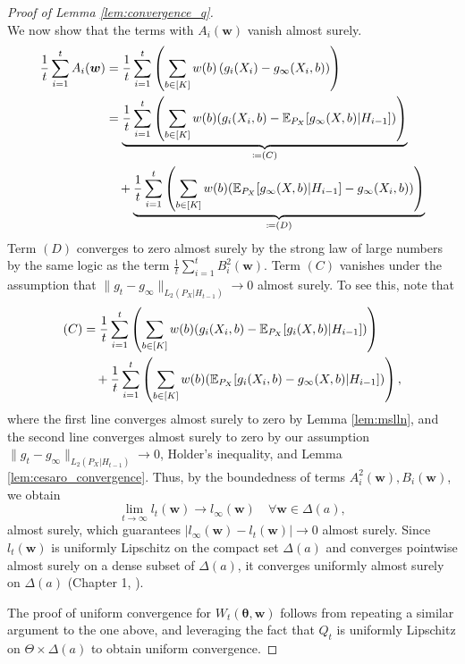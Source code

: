 \documentclass{article}
\begin{document}
\begin{appendices}
\begin{proof}[Proof of Lemma \ref{lem:convergence_q}]
\begin{equation}
\end{equation}
We now show that the terms with $A_i(\bm{w})$ vanish almost surely. 
\begin{align}
    \frac{1}{t}\sum_{i=1}^t A_i(\boldsymbol{w}) &= \frac{1}{t}\sum_{i=1}^t \left(\sum_{b \in [K]} w(b) \left( g_i(X_i) - g_\infty(X_i, b) \right) \right) \\
    &= \underbrace{\frac{1}{t}\sum_{i=1}^t \left(\sum_{b \in [K]} w(b)(g_i(X_i,b) - \mathbb{E}_{P_X}[g_\infty(X,b)|H_{i-1}]) \right)}_{\coloneqq(C)}\\
    &\quad + \underbrace{\frac{1}{t}\sum_{i=1}^t \left(\sum_{b \in [K]} w(b) (\mathbb{E}_{P_X}[g_\infty(X, b)|H_{i-1}] - g_\infty(X_i,b)) \right)}_{\coloneqq(D)}
\end{align}
Term $(D)$ converges to zero almost surely by the strong law of large numbers by the same logic as the term $\frac{1}{t}\sum_{i=1}^t B_i^2(\bm{w})$. Term $(C)$ vanishes under the assumption that $\|g_t -g_\infty\|_{L_2(P_X|H_{t-1})} \rightarrow 0$ almost surely. To see this, note that 
\begin{align}
    (C) &= \frac{1}{t}\sum_{i=1}^t \left(\sum_{b \in [K]} w(b)(g_i(X_i,b) - \mathbb{E}_{P_X}[g_i(X,b)|H_{i-1}]) \right) \\
    &\quad + \frac{1}{t}\sum_{i=1}^t \left(\sum_{b \in [K]} w(b)(\mathbb{E}_{P_X}[g_i(X_i,b)-g_\infty(X,b)|H_{i-1}]) \right),
\end{align}
where the first line converges almost surely to zero by Lemma \ref{lem:mslln}, and the second line converges almost surely to zero by our assumption $\|g_t -g_\infty\|_{L_2(P_X|H_{t-1})} \rightarrow 0$, Holder's inequality, and Lemma \ref{lem:cesaro_convergence}. Thus, by the boundedness of terms $A_i^2(\bm{w}), B_i(\bm{w})$, we obtain
\begin{equation}
    \lim_{t \rightarrow \infty} l_t(\bm{w}) \rightarrow l_\infty(\bm{w}) \quad \forall \bm{w} \in \Delta(a),
\end{equation}
almost surely, which guarantees $|l_\infty(\bm{w}) - l_t(\bm{w})| \rightarrow 0$ almost surely. Since $l_t(\bm{w})$ is uniformly Lipschitz on the compact set $\Delta(a)$ and converges pointwise almost surely on a dense subset of $\Delta(a)$, it converges uniformly almost surely on $\Delta(a)$ (Chapter 1, \cite{vandervaart1996weak}). 

The proof of uniform convergence for $W_t(\bm{\theta}, \bm{w})$ follows from repeating a similar argument to the one above, and leveraging the fact that $Q_t$ is uniformly Lipschitz on $\Theta \times \Delta(a)$ to obtain uniform convergence. 
\end{proof}


\end{appendices}
\end{document}
